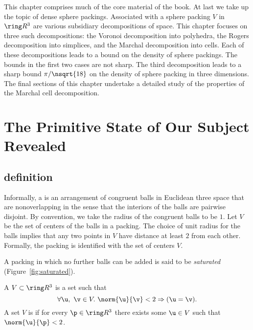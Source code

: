\begin{cnl}
\begin{summary}
  This chapter comprises much of the core material of the book.  At
  last we take up the topic of dense sphere packings.  Associated with
  a sphere packing $V$ in $\vecR{3}$ are various subsidiary
  decompositions of space.  This chapter focuses on three such
  decompositions: the Voronoi decomposition into polyhedra, the Rogers
  decomposition into simplices, and the Marchal decomposition into
  cells.  Each of these decompositions leads to a bound on the density
  of sphere packings.  The bounds in the first two cases are not
  sharp.  The third decomposition leads to a sharp bound
  $\pi/\nsqrt{18}$ on the density of sphere packing in three
  dimensions.  The final sections of this chapter undertake a detailed
  study of the properties of the Marchal cell decomposition.
\end{summary}


\section{The Primitive State of Our Subject Revealed}\label{primitive state}


\subsection{definition}\label{definition}

Informally, a  is an arrangement of congruent balls
in Euclidean three space that are nonoverlapping in the sense that the
interiors of the balls are pairwise disjoint.  By convention, we take
the radius of the congruent balls to be $1$.
Let $ V$ be the set of centers of the balls in a packing. The choice
of unit radius for the balls implies that any two points in $ V$ have
distance at least $2$ from each other.  Formally, the packing is
identified with the set of centers $V$.  
%

A packing in which no further balls can be added is said to be {\it
saturated} (Figure~\ref{fig:saturated}).

\figDEQCVQL %


\begin{definition}
\label{def:packing,saturated}
A  $ V\subset \vecR{3}$ is a set such that
\[ 
\forall  \u,~\v\in  V.~  \norm{ \u}{\v} < 2 \Rightarrow ( \u=\v).
\]  
A set $V$ is  if for every $\p\in\vecR{3}$ there
exists some $ \u\in V$ such that $\norm{ \u}{\p}< 2$.
\end{definition}




\end{cnl}
